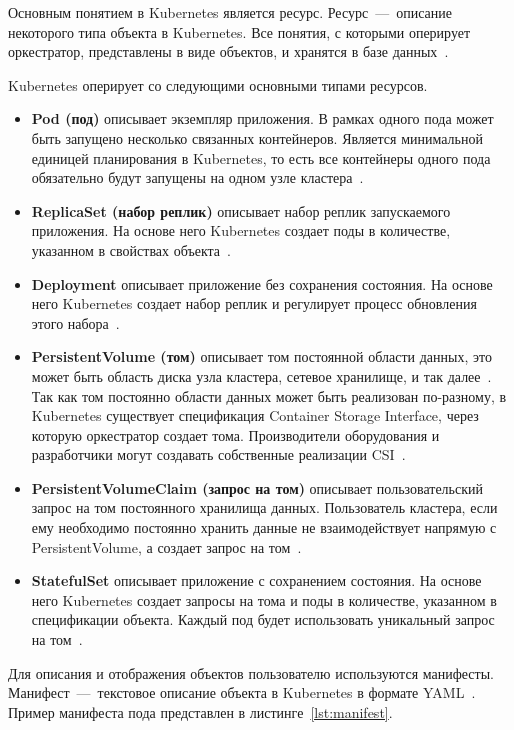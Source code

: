 Основным понятием в Kubernetes является ресурс. Ресурс~---~описание некоторого типа объекта в Kubernetes. Все понятия, с которыми оперирует оркестратор, представлены в виде объектов, и хранятся в базе данных~\cite{kubernetesresources}.

Kubernetes оперирует со следующими основными типами ресурсов.

\begin{itemize}
	\item \textbf{Pod (под)} описывает экземпляр приложения. В рамках одного пода может быть запущено несколько связанных контейнеров. Является минимальной единицей планирования в Kubernetes, то есть все контейнеры одного пода обязательно будут запущены на одном узле кластера~\cite{pods}.
	\item \textbf{ReplicaSet (набор реплик)} описывает набор реплик запускаемого приложения. На основе него Kubernetes создает поды в количестве, указанном в свойствах объекта~\cite{rs}.
	\item \textbf{Deployment} описывает приложение без сохранения состояния. На основе него Kubernetes создает набор реплик и регулирует процесс обновления этого набора~\cite{deploy}.
	\item \textbf{PersistentVolume (том)} описывает том постоянной области данных, это может быть область диска узла кластера, сетевое хранилище, и так далее~\cite{pv}. Так как том постоянно области данных может быть реализован по-разному, в Kubernetes существует спецификация Container Storage Interface, через которую оркестратор создает тома. Производители оборудования и разработчики могут создавать собственные реализации CSI~\cite{csi}.
	\item \textbf{PersistentVolumeClaim (запрос на том)} описывает пользовательский запрос на том постоянного хранилища данных. Пользователь кластера, если ему необходимо постоянно хранить данные не взаимодействует напрямую с PersistentVolume, а создает запрос на том~\cite{pv}.
	\item \textbf{StatefulSet} описывает приложение с сохранением состояния. На основе него Kubernetes создает запросы на тома и поды в количестве, указанном в спецификации объекта. Каждый под будет использовать уникальный запрос на том~\cite{sts}.
\end{itemize}

\newpage

Для описания и отображения объектов пользователю используются манифесты. Манифест~---~текстовое описание объекта в Kubernetes в формате YAML~\cite{kubernetesresources}. Пример манифеста пода представлен в листинге~\ref{lst:manifest}.

